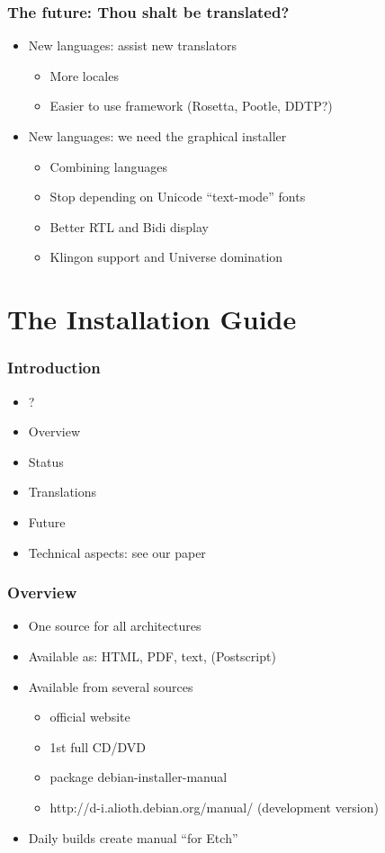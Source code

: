 \documentclass{beamer}
\begin{document}
\begin{frame}
  \frametitle{The future: Thou shalt be translated?}
	\begin{itemize}
	\item
		New languages: assist new translators
		\begin{itemize}
			\item
				More locales
			\item
				Easier to use framework (Rosetta, Pootle, DDTP?)
		\end{itemize}
	\item
		New languages: we need the graphical installer
		\begin{itemize}
			\item
				Combining languages
			\item
				Stop depending on Unicode ``text-mode'' fonts
			\item
				Better RTL and Bidi display
			\item
				Klingon support and Universe domination
		\end{itemize}
	\end{itemize}
\end{frame}


\section{The Installation Guide}

\begin{frame}
  \frametitle{Introduction}
	\begin{itemize}
	\item
		?
	\item
		Overview
	\item
		Status
	\item
		Translations
	\item
		Future
	\item
		Technical aspects: see our paper
	\end{itemize}
\end{frame}

\begin{frame}
  \frametitle{Overview}
	\begin{itemize}
	\item
		One source for all architectures
	\item
		Available as: HTML, PDF, text, (Postscript)
	\item
		Available from several sources
		\begin{itemize}
		\item
			official website
		\item
			1st full CD/DVD
		\item
			package debian-installer-manual
		\item
			http://d-i.alioth.debian.org/manual/ (development version)
		\end{itemize}
	\item
		Daily builds create manual ``for Etch''
	\end{itemize}
\end{frame}
\end{document}
